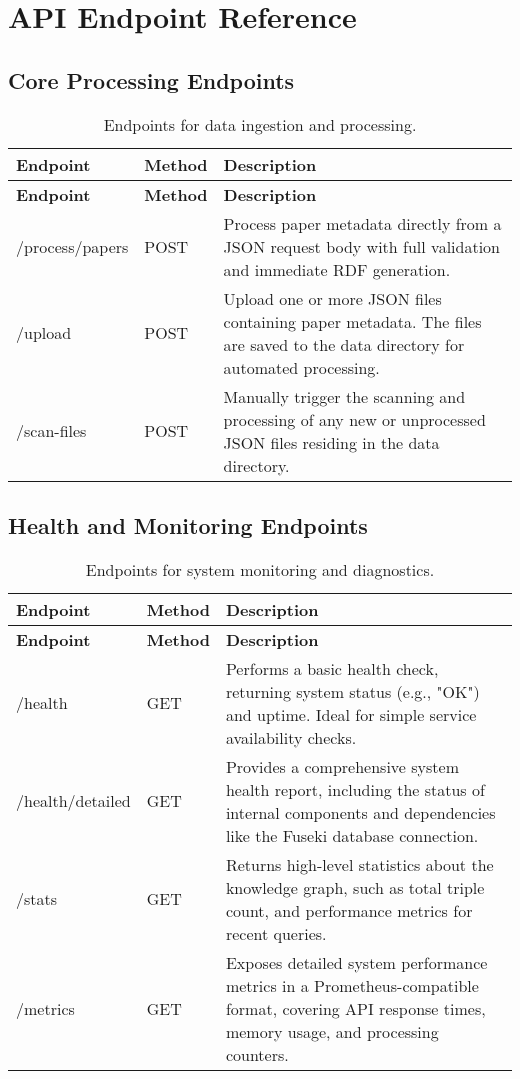 \documentclass[12pt,a4paper]{article}
\begin{document}
\section{API Endpoint Reference}
\label{app:api}

\subsection{Core Processing Endpoints}
\begin{longtable}{@{}p{3cm} p{2cm} p{8cm}@{}}
\caption{Endpoints for data ingestion and processing.} \\
\toprule
\textbf{Endpoint} & \textbf{Method} & \textbf{Description} \\
\midrule
\endfirsthead
\toprule
\textbf{Endpoint} & \textbf{Method} & \textbf{Description} \\
\midrule
\endhead
\bottomrule
\endfoot
/process/papers & POST & Process paper metadata directly from a JSON request body with full validation and immediate RDF generation. \\
\hline
/upload & POST & Upload one or more JSON files containing paper metadata. The files are saved to the data directory for automated processing. \\
\hline
/scan-files & POST & Manually trigger the scanning and processing of any new or unprocessed JSON files residing in the data directory. \\
\end{longtable}

\subsection{Health and Monitoring Endpoints}
\begin{longtable}{@{}p{3.5cm} p{2cm} p{7.5cm}@{}}
\caption{Endpoints for system monitoring and diagnostics.} \\
\toprule
\textbf{Endpoint} & \textbf{Method} & \textbf{Description} \\
\midrule
\endfirsthead
\toprule
\textbf{Endpoint} & \textbf{Method} & \textbf{Description} \\
\midrule
\endhead
\bottomrule
\endfoot
/health & GET & Performs a basic health check, returning system status (e.g., "OK") and uptime. Ideal for simple service availability checks. \\
\hline
/health/detailed & GET & Provides a comprehensive system health report, including the status of internal components and dependencies like the Fuseki database connection. \\
\hline
/stats & GET & Returns high-level statistics about the knowledge graph, such as total triple count, and performance metrics for recent queries. \\
\hline
/metrics & GET & Exposes detailed system performance metrics in a Prometheus-compatible format, covering API response times, memory usage, and processing counters. \\
\end{longtable}
\end{document}
